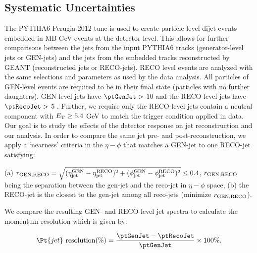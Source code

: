 \subsection{Systematic Uncertainties} \label{sect:SysUnc}
\label{sect:Embedding}

The PYTHIA6 Perugia 2012 tune is used to create particle level dijet events embedded in MB  GeV events at the detector level.  This allows for further comparisons between the jets from the input PYTHIA6 tracks (generator-level jets or GEN-jets) and the jets from the embedded tracks reconstructed by GEANT (reconstructed jets or RECO-jets). RECO level events are analyzed with the same selections and parameters as used by the data analysis. All particles of GEN-level events are required to be in their final state (particles with no further daughters). GEN-level jets have $\ptGenJet > $ 10 \GeVc and the RECO-level jets have $\ptRecoJet >$ 5 \GeVc. Further, we require only the RECO-level jets contain a neutral component with $ E_{\rm T} \geq 5.4$ GeV to match the trigger condition applied in data. Our goal is to study the effects of the detector response on jet reconstruction and our analysis.  In order to compare the same jet pre- and post-reconstruction, we apply a `nearness' criteria in the $\eta-\phi$ that matches a GEN-jet to one RECO-jet satisfying: 

(a) $r_{\rm GEN, RECO}=\sqrt{(\eta^{\rm GEN}_{\rm jet}-\eta^{\rm RECO}_{\rm jet})^2+(\phi^{\rm GEN}_{\rm jet}-\phi^{\rm RECO}_{\rm jet})^2}\leq0.4$, $r_{\rm GEN, RECO}$ being the separation between the gen-jet and the reco-jet in $\eta-\phi$ space, (b) the RECO-jet is the closest to the gen-jet among all reco-jets (minimize $r_{\rm GEN, RECO}$).  

We compare the resulting GEN- and RECO-level jet spectra to calculate the momentum resolution which is given by:

\begin{equation}
	\Pt{jet} \textnormal{ resolution} (\%) = \frac{\text{\ptGenJet} - \text{\ptRecoJet}}{\text{\ptGenJet}} \times \text{100} \%.
\end{equation}


